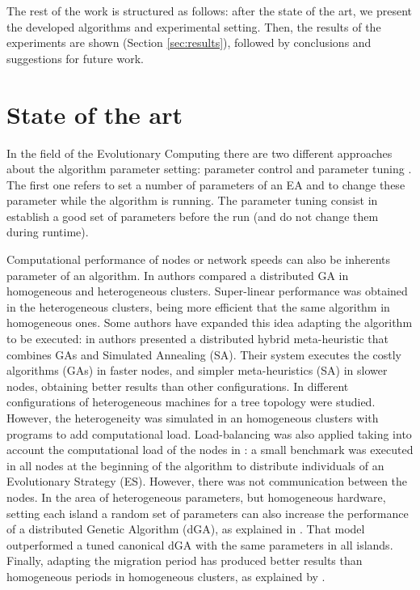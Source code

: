 \documentclass{sig-alternate}
\begin{document}
The rest of the work is structured as follows: after the state of
the art, we present the developed algorithms and experimental setting. 
Then, the results of the experiments are shown (Section \ref{sec:results}), followed by conclusions and suggestions for future work.


%
\section{State of the art}
\label{sec:soa}
%

In the field of the Evolutionary Computing there are two different approaches about the algorithm parameter setting: parameter control and parameter tuning \cite{PARAMETERTUNING}. The first one refers to set a number of parameters of an EA and to change these parameter while the algorithm is running. The parameter tuning consist in establish a good set of parameters before the run (and do not change them during runtime).

 Computational performance of nodes or network speeds can also be inherents parameter of an algorithm. In \cite{HETEROGENEOUSHARD} authors compared a distributed GA in homogeneous and heterogeneous clusters. Super-linear performance was obtained in the heterogeneous clusters, being more efficient that the same algorithm in homogeneous ones. Some authors have expanded this idea adapting the algorithm to be executed: in \cite{HYDROCM} authors presented a distributed hybrid meta-heuristic that combines GAs and Simulated Annealing (SA). Their system executes the costly algorithms (GAs) in faster nodes, and simpler meta-heuristics (SA) in slower nodes, obtaining better results than other configurations. In \cite{HETEROGENEOUSTOPOLOGY} different configurations of heterogeneous machines for a tree topology were studied. However, the heterogeneity was simulated in an homogeneous clusters with programs to add computational load. Load-balancing was also applied taking into account the computational load of the nodes in \cite{PARALLELIMPLEMENTATION}: a small benchmark was executed in all nodes at the beginning of the algorithm to distribute individuals of an Evolutionary Strategy (ES). However, there was not communication between the nodes. In the area of heterogeneous parameters, but homogeneous hardware, setting each island a random set of parameters can also increase the performance of a distributed Genetic Algorithm (dGA), as explained in \cite{HETEROGENEOUSPARAMETERS}. That model outperformed a tuned canonical dGA with the same parameters in all islands. Finally, adapting the migration period has produced better results than homogeneous periods in homogeneous clusters, as explained by \cite{HETEROGENEOUSMIGRATION}.
\end{document}
